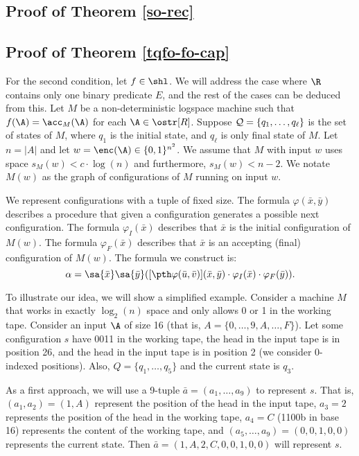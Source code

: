\subsection*{Proof of Theorem \ref{so-rec}}


\subsection*{Proof of Theorem \ref{tqfo-fo-cap}}

For the second condition, let $f \in \shl$. We will address the case where $\R$ contains only one binary predicate $E$, and the rest of the cases can be deduced from this. Let $M$ be a non-deterministic logspace machine such that $f(\A) = \acc_M(\A)$ for each $\A \in \ostr[R]$. Suppose ${\cal Q} = \{q_1,\ldots,q_{\ell}\}$ is the set of states of $M$, where $q_1$ is the initial state, and $q_{\ell}$ is only final state of $M$. Let $n = \vert A \vert$ and let $w = \enc(\A) \in \{0,1\}^{n^2}$. We assume that $M$ with input $w$ uses space $s_M(w) < c\cdot\log(n)$ and furthermore, $s_M(w) < n-2$. We notate $M(w)$ as the graph of configurations of $M$ running on input $w$.

We represent configurations with a tuple of fixed size. The formula $\varphi(\bar{x},\bar{y})$ describes a procedure that given a configuration generates a possible next configuration. The formula $\varphi_I(\bar{x})$ describes that $\bar{x}$ is the initial configuration of $M(w)$. The formula $\varphi_F(\bar{x})$ describes that $\bar{x}$ is an accepting (final) configuration of $M(w)$. The formula we construct is:
$$
\alpha = \sa{\bar{x}}\sa{\bar{y}}([\pth \varphi(\bar{u},\bar{v})](\bar{x},\bar{y})\cdot \varphi_I(\bar{x})\cdot\varphi_F(\bar{y})).
$$

To illustrate our idea, we will show a simplified example. Consider a machine $M$ that works in exactly $\log_2(n)$ space and only allows 0 or 1 in the working tape. Consider an input $\A$ of size 16 (that is, $A = \{0,\ldots,9,A,\ldots,F\}$). Let some configuration $s$ have 0011 in the working tape, the head in the input tape is in position 26, and the head in the input tape is in position 2 (we consider 0-indexed positions). Also, $Q = \{q_1,\ldots,q_5\}$ and the current state is $q_3$.

As a first approach, we will use a 9-tuple $\bar{a} = (a_1,\ldots,a_9)$ to represent $s$. That is, $(a_1,a_2) = (1,A)$ represent the position of the head in the input tape, $a_3 = 2$ represents the position of the head in the working tape, $a_4 = C$ (1100b in base 16) represents the content of the working tape, and $(a_5,\ldots,a_9) = (0,0,1,0,0)$ represents the current state. Then $\bar{a} = (1,A,2,C,0,0,1,0,0)$ will represent $s$.

